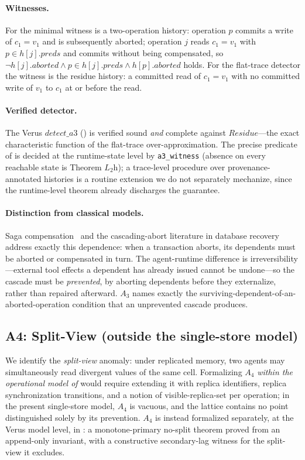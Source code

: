 \documentclass[journal,compsoc,10pt]{IEEEtran}
\providecommand{\citep}{\cite}
\theoremstyle{definition}
\theoremstyle{remark}
\newcommand{\fld}[1]{\mathit{#1}}
\begin{document}
\paragraph{Witnesses.}
For  the minimal witness is a two-operation history: operation
$p$ commits a write of $c_1 = v_1$ and is subsequently aborted; operation
$j$ reads $c_1 = v_1$ with $p \in h[j].\fld{preds}$ and commits without
being compensated, so
$\neg h[j].\fld{aborted} \wedge p \in h[j].\fld{preds} \wedge
h[p].\fld{aborted}$ holds. For the flat-trace detector the witness is the
residue history: a committed read of $c_1 = v_1$ with no committed write of
$v_1$ to $c_1$ at or before the read.

\paragraph{Verified detector.}
The Verus $\fld{detect\_a3}$ () is verified
sound \emph{and} complete against $\fld{Residue}$---the exact characteristic
function of the flat-trace over-approximation. The precise predicate of
 is decided at the runtime-state level by \texttt{a3\_witness}
(absence on every reachable state is Theorem $L_2$h); a trace-level
procedure over provenance-annotated histories is a routine extension we do
not separately mechanize, since the runtime-level theorem already
discharges the guarantee.

\paragraph{Distinction from classical models.}
Saga compensation~\citep{GarciaMolinaSalem1987Sagas} and the
cascading-abort literature in database recovery address exactly this
dependence: when a transaction aborts, its dependents must be aborted or
compensated in turn. The agent-runtime difference is
irreversibility---external tool effects a dependent has already issued
cannot be undone---so the cascade must be \emph{prevented}, by aborting
dependents before they externalize, rather than repaired afterward. $A_3$
names exactly the surviving-dependent-of-an-aborted-operation condition
that an unprevented cascade produces.

\subsection{A4: Split-View (outside the single-store model)}
\label{sec:a4}
We identify the \emph{split-view} anomaly: under
replicated memory, two agents may simultaneously read divergent values
of the same cell. Formalizing $A_4$ \emph{within the operational model of
} would require extending it with replica
identifiers, replica synchronization transitions, and a notion of
visible-replica-set per operation; in the present single-store model,
$A_4$ is vacuous, and the lattice contains no point distinguished solely
by its prevention. $A_4$ is instead formalized separately, at the Verus
model level, in : a monotone-primary no-split
theorem proved from an append-only invariant, with a constructive
secondary-lag witness for the split-view it excludes.
\end{document}
